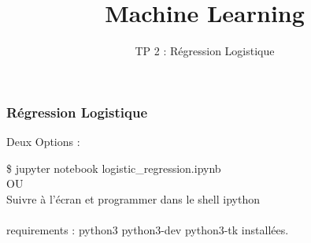 \documentclass{formation}
\title{Machine Learning}
\subtitle{TP 2 : Régression Logistique}
\begin{document}
\maketitle

\begin{frame}
  \frametitle{Régression Logistique}
  \begin{center}
    Deux Options :
  \end{center}
  \$ jupyter notebook logistic\_regression.ipynb\\
  \newline
  OU \\
  \newline
  Suivre à l'écran et programmer dans le shell ipython\\
  \\
  requirements : python3 python3-dev python3-tk installées.
\end{frame}
\end{document}
